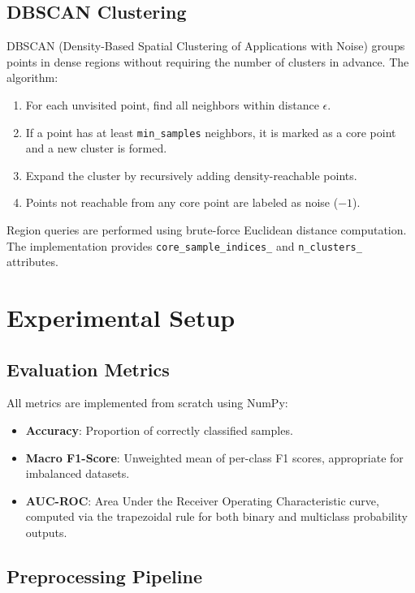\documentclass[conference,12pt]{IEEEtran}
\begin{document}
\subsection{DBSCAN Clustering}

DBSCAN (Density-Based Spatial Clustering of Applications with Noise) \cite{ester1996density} groups points in dense regions without requiring the number of clusters in advance. The algorithm:
\begin{enumerate}
    \item For each unvisited point, find all neighbors within distance $\epsilon$.
    \item If a point has at least \texttt{min\_samples} neighbors, it is marked as a core point and a new cluster is formed.
    \item Expand the cluster by recursively adding density-reachable points.
    \item Points not reachable from any core point are labeled as noise ($-1$).
\end{enumerate}

Region queries are performed using brute-force Euclidean distance computation. The implementation provides \texttt{core\_sample\_indices\_} and \texttt{n\_clusters\_} attributes.

\section{Experimental Setup}

\subsection{Evaluation Metrics}

All metrics are implemented from scratch using NumPy:
\begin{itemize}
    \item \textbf{Accuracy}: Proportion of correctly classified samples.
    \item \textbf{Macro F1-Score}: Unweighted mean of per-class F1 scores, appropriate for imbalanced datasets.
    \item \textbf{AUC-ROC}: Area Under the Receiver Operating Characteristic curve, computed via the trapezoidal rule for both binary and multiclass probability outputs.
\end{itemize}

\subsection{Preprocessing Pipeline}
\end{document}
